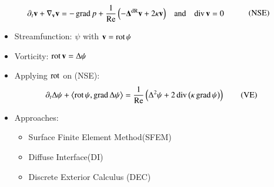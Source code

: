 \documentclass[15pt,t,aspectratio=1610]{beamer}
\begin{document}
  \begin{frame}
          \begin{align}
            \begin{aligned}
            \partial_{t}\mathbf{v} + \nabla_{\mathbf{v}} \mathbf{v} &= - \operatorname{grad} p + \frac{1}{\text{Re}} \left(- \boldsymbol{\Delta}^{\textup{dR}} \mathbf{v} + 2 \kappa \mathbf{v} \right)
              &\text{and}&&\operatorname{div}\mathbf{v} &= 0
              \end{aligned}\tag{NSE}
          \end{align}
    \begin{itemize}
      \item Streamfunction: \( \psi \) with \( \mathbf{v} = \operatorname{rot}\psi \)
      \item Vorticity: \( \operatorname{rot}\mathbf{v} = \Delta\psi \)
      \item Applying \( \operatorname{rot} \) on (NSE): 
        \begin{align}
          \partial_{t}\Delta\psi + \left\langle \operatorname{rot}\psi , \operatorname{grad}\Delta\psi \right\rangle &= \frac{1}{\text{Re}}\left( \Delta^{2}\psi + 2\operatorname{div}\left( \kappa\operatorname{grad}\psi \right) \right)
          \tag{VE}
        \end{align}
      \item Approaches:\quad \eg 
        \begin{itemize}
          \item Surface Finite Element Method\footnotemark[1]\footnotemark[2] (SFEM)
          \item Diffuse Interface\footnotemark[3] (DI)
            \item Discrete Exterior Calculus (DEC)
        \end{itemize}
    \end{itemize}
		\vskip5pt
  \end{frame}
\end{document}
